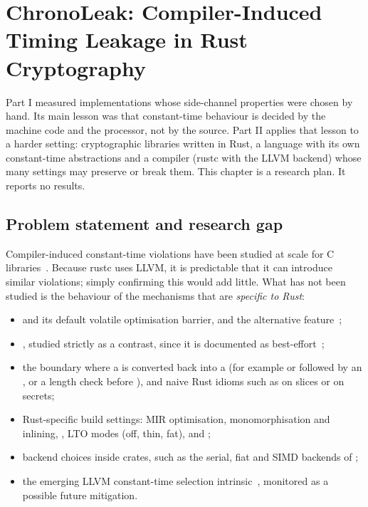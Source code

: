 \chapter{ChronoLeak: Compiler-Induced Timing Leakage in Rust Cryptography}
\label{ch:chronoleak}

Part I measured implementations whose side-channel properties were chosen by hand. Its main lesson was that constant-time behaviour is decided by the machine code and the processor, not by the source. Part II applies that lesson to a harder setting: cryptographic libraries written in Rust, a language with its own constant-time abstractions and a compiler (rustc with the LLVM backend) whose many settings may preserve or break them. This chapter is a research plan. It reports no results.

\section{Problem statement and research gap}

Compiler-induced constant-time violations have been studied at scale for C libraries~\cite{breakingbad,funwithflags,docc}. Because rustc uses LLVM, it is predictable that it can introduce similar violations; simply confirming this would add little. What has not been studied is the behaviour of the mechanisms that are \emph{specific to Rust}:

\begin{itemize}
  \item {} and its default volatile optimisation barrier, and the alternative  feature~\cite{subtle};
  \item {}, studied strictly as a contrast, since it is documented as best-effort~\cite{blackbox};
  \item the boundary where a  is converted back into a  (for example  or  followed by an , or a length check before ), and naive Rust idioms such as \code{==} on slices or  on secrets;
  \item Rust-specific build settings: MIR optimisation, monomorphisation and inlining, , LTO modes (off, thin, fat),  and ;
  \item backend choices inside crates, such as the serial, fiat and SIMD backends of ;
  \item the emerging LLVM constant-time selection intrinsic~\cite{tobctselect}, monitored as a possible future mitigation.
\end{itemize}

